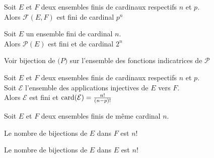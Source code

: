 \documentclass[12pt,twoside,a4paper]{article}
\author{MPSI 2}
\begin{document}
	\maketitle
	\begin{prop}
		Soit $E$ et $F$ deux ensembles finis de cardinaux respectifs $n$ et $p$.\\
		Alors $\mathcal{F}(E,F)$ est fini de cardinal $p^{n}$
	\end{prop}
	\begin{coro}
		Soit $E$ un ensemble fini de cardinal $n$.\\
		Alors $\mathcal{P}(E)$ est fini et de cardinal $2^{n}$
	\end{coro}
	\begin{preuve}
		Voir bijection de $\mathcal(P)$ sur l'ensemble des fonctions indicatrices de $\mathcal{P}$
	\end{preuve}
	\begin{prop}
		Soit $E$ et $F$ deux ensembles finis de cardinaux respectifs $n$ et $p$.\\
		Soit $\mathcal{E}$ l'ensemble des applications injectives de $E$ vers $F$.\\
		Alors $\mathcal{E}$ est fini et $\text{card}(\mathcal{E})=\frac{n!}{(n-p)!}$
	\end{prop}
	\begin{coro}
		Soit $E$ et $F$ deux ensembles finis de m\^eme cardinal $n$.\\
		\begin{liste}
			\item Le nombre de bijections de $E$ dans $F$ est $n!$
			\item Le nombre de bijections de $E$ dans $E$ est $n!$
		\end{liste}
	\end{coro}
	
\end{document}
